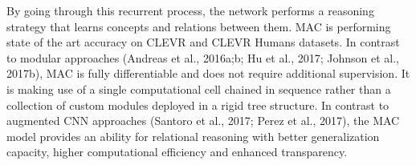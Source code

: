 By going through this recurrent process, the network performs a reasoning strategy that learns concepts and relations between them. MAC is performing state of the art accuracy on CLEVR and CLEVR Humans datasets.
In contrast to modular approaches (Andreas et al., 2016a;b; Hu et al., 2017; Johnson et al., 2017b), MAC is fully
differentiable and does not require additional supervision. It is making use of a single computational cell chained in sequence rather than a collection of custom modules deployed in a rigid tree structure.
In contrast to augmented CNN approaches (Santoro et al., 2017; Perez et al., 2017),  the MAC model provides an ability for relational reasoning with better generalization capacity, higher
computational efficiency and enhanced transparency.

